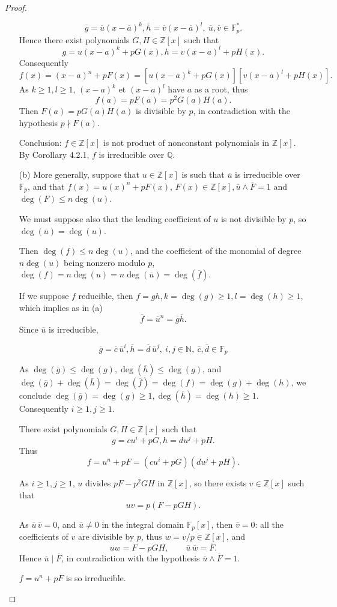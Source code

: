 \documentclass[11pt,a4paper]{article}
\newcommand{\F}{\mathbb{F}}
\begin{document}
\begin{proof}
\begin{enumerate}
$$\overline{g} = \overline{u}( x-\overline{a})^k, \overline{h} = \overline{v}( x-\overline{a})^l, \ \overline{u},\overline{v} \in \mathbb{F}_p^*.$$
Hence there exist polynomials $G,H \in \mathbb{Z}[x]$ such that
 $$g = u(x-a)^k + p G(x), h =v(x-a)^l + pH(x).$$
Consequently
 $$f(x) = (x-a)^n + pF(x) = [u(x-a)^k + p G(x)][v(x-a)^l + pH(x)].$$
As $k\geq 1, l \geq 1$, $(x-a)^k$ et $(x-a)^l$ have $a$ as a root, thus
 $$f(a) = pF(a) = p^2 G(a) H(a).$$
Then $F(a) = p G(a)H(a)$ is divisible by $p$, in contradiction with the hypothesis $p\nmid F(a)$.
 
 Conclusion: $f\in \mathbb{Z}[x]$ is not product of nonconstant polynomials  in $\mathbb{Z}[x]$. By Corollary 4.2.1, $f$ is irreducible over $\mathbb{Q}$.
 

 \item[(b)]
More generally, suppose that $u \in \mathbb{Z}[x]$ is such that $\overline{u}$ is irreducible over $\F_p$, and that $f(x) = u(x)^n + pF(x)$, $F(x) \in \mathbb{Z}[x], \overline{u}\wedge \overline{F} =1$ and $\deg(F) \leq n \deg(u)$.

We must suppose also that the leading coefficient of $u$ is not divisible by $p$, so $\deg(\overline{u}) = \deg(u) $.

Then $\deg(f) \leq n \deg(u)$, and the coefficient of the monomial of degree $n \deg(u)$ being nonzero modulo $p$, $\deg(f) = n \deg(u)=n\deg(\overline{u}) =  \deg(\overline{f})$.

If we suppose $f$ reducible, then  $f = gh, k = \deg(g)\geq 1, l = \deg(h) \geq 1$, which implies as in (a) 
$$\overline{f} = \overline{u}^n = \overline{g}\overline{h}.$$
Since $\overline{u}$ is irreducible,
 
 $$\overline{g} = \overline{c} \, \overline{u}^i, \overline{h} =\overline{d} \,  \overline{u}^j,\  i,j \in \mathbb{N}, \ \overline{c}, \overline{d} \in \F_p$$
 
As $\deg(\overline{g}) \leq \deg(g), \deg(\overline{h}) \leq \deg(g)$, and $\deg(\overline{g}) + \deg(\overline{h}) = \deg(\overline{f}) = \deg(f) = \deg(g) + \deg(h)$, we conclude $\deg(\overline{g})  = \deg(g)\geq 1, \deg(\overline{h})= \deg(h)\geq 1$.  Consequently $i\geq 1, j \geq 1$.

There exist polynomials $G,H \in \mathbb{Z}[x]$ such that
$$g= cu^i + p G, h = du^j+pH.$$
Thus
$$f = u^n +pF = (cu^i+pG)(du^j+pH).$$

As $i\geq 1, j\geq 1$, $u$ divides $pF - p^2 GH$ in $\mathbb{Z}[x]$, so there exists $v \in \mathbb{Z}[x]$ such that 
$$uv = p(F - pGH).$$

As $\overline{u}\, \overline{v} = 0$, and $ \overline{u} \neq 0$ in the integral domain $\F_p[x]$, then $\overline{v} = 0$: all the coefficients of $v$ are divisible by $p$, thus $w= v/p \in \mathbb{Z}[x]$, and
$$uw = F-pGH,\qquad  \overline{u}\, \overline{w} = \overline{F}.$$
Hence $\overline{u} \mid \overline{F}$, in contradiction with the hypothesis $\overline{u} \wedge \overline{F} = 1$.

$f = u^n +pF$ is so irreducible.
\end{enumerate}
\end{proof}
\end{document}
